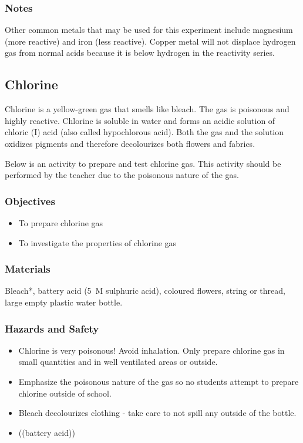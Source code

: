 \subsubsection*{Notes}
Other common metals that may be used for this experiment include magnesium (more reactive) and iron (less reactive). Copper metal will not displace hydrogen gas from normal acids because it is below hydrogen in the reactivity series.

\subsection{Chlorine}

Chlorine is a yellow-green gas that smells like bleach. The gas is poisonous and highly reactive. Chlorine is soluble in water and forms an acidic solution of chloric (I) acid (also called hypochlorous acid). Both the gas and the solution oxidizes pigments and therefore decolourizes both flowers and fabrics.

Below is an activity to prepare and test chlorine gas. This activity should be performed by the teacher due to the poisonous nature of the gas.

\subsubsection*{Objectives}
\begin{itemize}
\item{To prepare chlorine gas}
\item{To investigate the properties of chlorine gas}
\end{itemize}

\subsubsection*{Materials}
Bleach*, battery acid (5~M sulphuric acid), coloured flowers, string or thread, large empty plastic water bottle.

\subsubsection*{Hazards and Safety}
\begin{itemize}
\item{Chlorine is very poisonous! Avoid inhalation. Only prepare chlorine gas in small quantities and in well ventilated areas or outside.}
\item{Emphasize the poisonous nature of the gas so no students attempt to prepare chlorine outside of school.}
\item{Bleach decolourizes clothing - take care to not spill any outside of the bottle.}
\item{((battery acid))}
\end{itemize}

